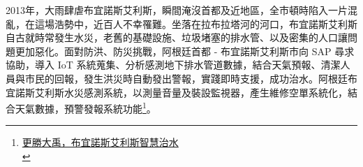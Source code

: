 \documentclass[a4paper,12pt]{article}
\begin{document}
\begin{enumerate}
\begin{enumerate}
2013年，大雨肆虐布宜諾斯艾利斯，瞬間淹沒首都及近地區，全市頓時陷入一片混亂，在這場浩勢中，近百人不幸罹難。坐落在拉布拉塔河的河口，布宜諾斯艾利斯自古就時常發生水災，老舊的基礎設施、垃圾堵塞的排水管、以及密集的人口讓問題更加惡化。面對防洪、防災挑戰，阿根廷首都 - 布宜諾斯艾利斯市向 SAP 尋求協助，導入 IoT 系統蒐集、分析感測地下排水管道數據，結合天氣預報、清潔人員與市民的回報，發生洪災時自動發出警報，實踐即時支援，成功治水。阿根廷布宜諾斯艾利斯水災感測系統，以測量音量及裝設監視器，產生維修空單系統化，結合天氣數據，預警發報系統功能\footnote{\href{https://www.sap.com/taiwan/assetdetail/2019/03/d6b73be6-407d-0010-87a3-c30de2ffd8ff.html}{更勝大禹，布宜諾斯艾利斯智慧治水}\\}。\\
\newpage
\end{enumerate}
\end{enumerate}
\end{document}

